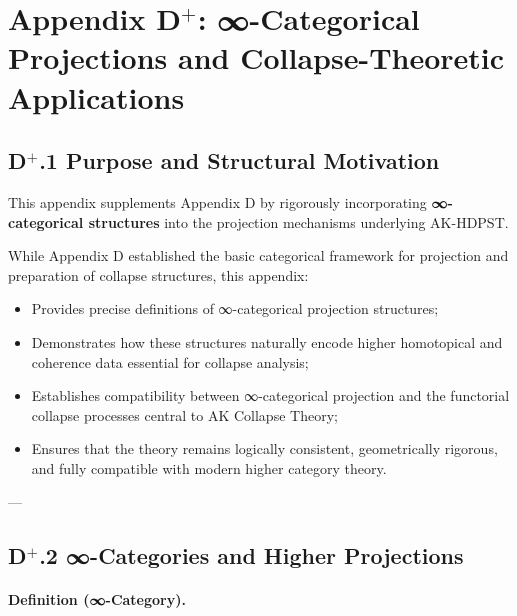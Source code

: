 \documentclass[11pt]{article}
\begin{document}

\section*{Appendix D$^{+}$: ∞-Categorical Projections and Collapse-Theoretic Applications}

\subsection*{D$^{+}$.1 Purpose and Structural Motivation}

This appendix supplements Appendix D by rigorously incorporating \textbf{∞-categorical structures} into the projection mechanisms underlying AK-HDPST.

While Appendix D established the basic categorical framework for projection and preparation of collapse structures, this appendix:

\begin{itemize}
    \item Provides precise definitions of ∞-categorical projection structures;
    \item Demonstrates how these structures naturally encode higher homotopical and coherence data essential for collapse analysis;
    \item Establishes compatibility between ∞-categorical projection and the functorial collapse processes central to AK Collapse Theory;
    \item Ensures that the theory remains logically consistent, geometrically rigorous, and fully compatible with modern higher category theory.
\end{itemize}

---

\subsection*{D$^{+}$.2 ∞-Categories and Higher Projections}

\paragraph{Definition (∞-Category).}
\end{document}
